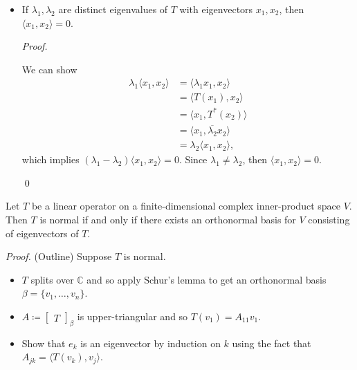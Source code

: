 \documentclass[12pt]{article}
\newenvironment{theorem}[2][Theorem]{\begin{trivlist}
\item[\hskip \labelsep {\bfseries #1}\hskip \labelsep {\bfseries #2.}]}{\end{trivlist}}
\newenvironment{sol}
    {\emph{Proof.}
    }
    {
    \qed
    }
\begin{document}
\begin{theorem}{6.15}
\begin{itemize}
    \item[(d)] If $\lambda_1, \lambda_2$ are distinct eigenvalues of $T$ with eigenvectors $x_1, x_2$, then $\langle x_1, x_2 \rangle = 0$.
    
    \begin{sol}
    We can show \begin{align*}
        \lambda_1 \langle x_1, x_2 \rangle &= \langle \lambda_1 x_1, x_2 \rangle \\
        &= \langle T(x_1), x_2 \rangle \\
        &= \langle x_1, T^*(x_2) \rangle \\
        &= \langle x_1, \overline{\lambda_2} x_2 \rangle \tag{From (c)} \\
        &= \lambda_2 \langle x_1, x_2 \rangle,
    \end{align*} which implies $(\lambda_1 - \lambda_2) \langle x_1, x_2 \rangle = 0$. Since $\lambda_1 \neq \lambda_2$, then $\langle x_1, x_2 \rangle = 0$.
    \end{sol}
\end{itemize}
\end{theorem}

\begin{theorem}{6.16}
Let $T$ be a linear operator on a finite-dimensional complex inner-product space $V$. Then $T$ is normal if and only if there exists an orthonormal basis for $V$ consisting of eigenvectors of $T$.
\end{theorem}

\textit{Proof.} (Outline) Suppose $T$ is normal.

\begin{itemize}
    \item $T$ splits over $\mathbb{C}$ and so apply Schur's lemma to get an orthonormal basis $\beta = \{v_1, \dots, v_n\}$.
    
    \item $A \coloneqq \begin{bmatrix} T \end{bmatrix}_\beta$ is upper-triangular and so $T(v_1) = A_{11}v_1$.
    
    \item Show that $e_k$ is an eigenvector by induction on $k$ using the fact that $A_{jk} = \langle T(v_k), v_j \rangle$.
\end{itemize}
\end{document}
